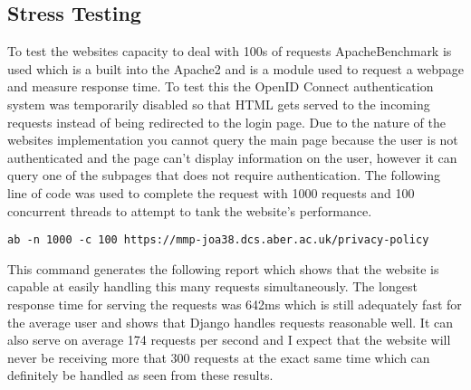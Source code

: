 \subsection{Stress Testing}
To test the websites capacity to deal with 100s of requests ApacheBenchmark \cite{apacheBenchmark} is used which is a built into the Apache2 \cite{apache2} and is a module used to request a webpage and measure response time. To test this the OpenID Connect \cite{OpenID} authentication system  was temporarily disabled so that HTML gets served to the incoming requests instead of being redirected to the login page. Due to the nature of the websites implementation you cannot query the main page because the user is not authenticated and the page can't display information on the user, however it can query one of the subpages that does not require authentication. The following line of code was used to complete the request with 1000 requests and 100 concurrent threads to attempt to tank the website's performance.

\verb|ab -n 1000 -c 100 https://mmp-joa38.dcs.aber.ac.uk/privacy-policy|

This command generates the following report which shows that the website is capable at easily handling this many requests simultaneously. The longest response time for serving the requests was 642ms which is still adequately fast for the average user and shows that Django handles requests reasonable well. It can also serve on average 174 requests per second and I expect that the website will never be receiving more that 300 requests at the exact same time which can definitely be handled as seen from these results.

